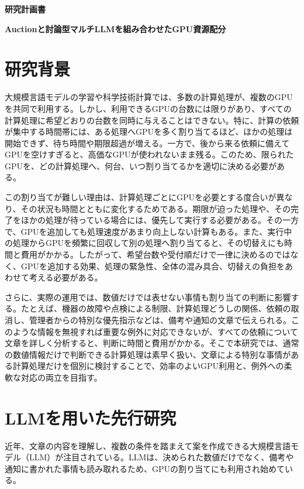 \documentclass[10pt,a4paper]{article}
\begin{document}
\begin{center}
  {\Large\sffamily\bfseries 研究計画書}\par
  \vspace{0.45em}
  {\large\sffamily\bfseries
  Auctionと討論型マルチLLMを組み合わせたGPU資源配分}
\end{center}

\section{研究背景}

大規模言語モデルの学習や科学技術計算では、多数の計算処理が、複数のGPUを共同で利用する。しかし、利用できるGPUの台数には限りがあり、すべての計算処理に希望どおりの台数を同時に与えることはできない。特に、計算の依頼が集中する時間帯には、ある処理へGPUを多く割り当てるほど、ほかの処理は開始できず、待ち時間や期限超過が増える。一方で、後から来る依頼に備えてGPUを空けすぎると、高価なGPUが使われないまま残る。このため、限られたGPUを、どの計算処理へ、何台、いつ割り当てるかを適切に決める必要がある。

この割り当てが難しい理由は、計算処理ごとにGPUを必要とする度合いが異なり、その状況も時間とともに変化するためである。期限が迫った処理や、その完了をほかの処理が待っている場合には、優先して実行する必要がある。その一方で、GPUを追加しても処理速度があまり向上しない計算もある。また、実行中の処理からGPUを頻繁に回収して別の処理へ割り当てると、その切替えにも時間と費用がかかる。したがって、希望台数や受付順だけで一律に決めるのではなく、GPUを追加する効果、処理の緊急性、全体の混み具合、切替えの負担をあわせて考える必要がある。

さらに、実際の運用では、数値だけでは表せない事情も割り当ての判断に影響する。たとえば、機器の故障や点検による制限、計算処理どうしの関係、依頼の取消し、管理者からの特別な優先指示などは、備考や通知の文章で伝えられる。このような情報を無視すれば重要な例外に対応できないが、すべての依頼について文章を詳しく分析すると、判断に時間と費用がかかる。そこで本研究では、通常の数値情報だけで判断できる計算処理は素早く扱い、文章による特別な事情がある計算処理だけを個別に検討することで、効率のよいGPU利用と、例外への柔軟な対応の両立を目指す。

\section{LLMを用いた先行研究}

近年、文章の内容を理解し、複数の条件を踏まえて案を作成できる大規模言語モデル（LLM）が注目されている。LLMは、決められた数値だけでなく、備考や通知に書かれた事情も読み取れるため、GPUの割り当てにも利用され始めている。
\end{document}
